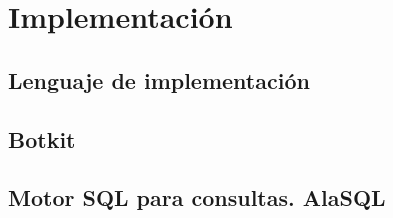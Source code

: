 \chapter{Implementación}

\section{Lenguaje de implementación}

\section{Botkit}

\section{Motor SQL para consultas. AlaSQL}